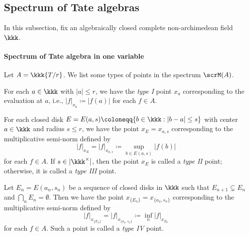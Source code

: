 \subsection{Spectrum of Tate algebras}

    In this subsection, fix an algebraically closed complete non-archimedean field \(\kkk\).

    \paragraph{Spectrum of Tate algebra in one variable} 
    Let \(A = \kkk\{T/r\}\).
    We list some types of points in the spectrum \(\scrM(A)\).

    \begin{construction}\label{cons:four_types_of_points_in_spectrum_of_Tate_algebra_in_one_variable}
        For each \(a \in \kkk\) with \(|a| \leq r\), we have the \emph{type I} point \(x_a\) corresponding to the evaluation at \(a\), i.e., \(|f|_{x_a} \coloneqq |f(a)|\) for each \(f \in A\).
        
        For each closed disk \(E = E(a,s) \coloneqq \{b \in \kkk : |b - a| \leq s\}\) with center \(a \in \kkk\) and radius \(s \leq r\), we have the point \(x_E = x_{a,s}\) corresponding to the multiplicative semi-norm defined by
        \[ |f|_{x_E} = |f|_{x_{a,s}} \coloneqq \sup_{b \in E(a,s)} |f(b)| \]
        for each \(f \in A\).
        If \(s \in |\kkk^\times|\), then the point \(x_E\) is called a \emph{type II} point; otherwise, it is called a \emph{type III} point.
        
        Let \(E_n = E(a_n,s_n)\) be a sequence of closed disks in \(\kkk\) such that \(E_{n+1} \subsetneq E_n\) and \(\bigcap_n E_n = \emptyset\).
        Then we have the point \(x_{\{E_n\}} = x_{\{a_n,s_n\}}\) corresponding to the multiplicative semi-norm defined by
        \[ |f|_{x_{\{E_n\}}} = |f|_{x_{\{a_n,s_n\}}} \coloneqq \inf_n |f|_{x_{E_n}} \]
        for each \(f \in A\).
        Such a point is called a \emph{type IV} point.
    \end{construction}

